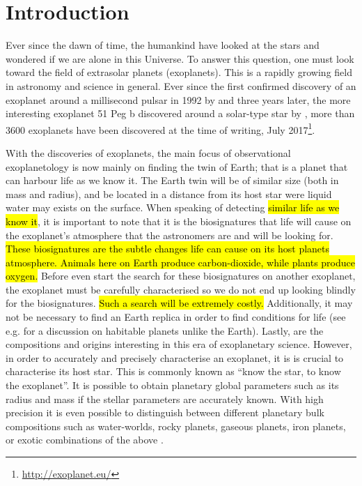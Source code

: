\chapter{Introduction}
\label{cha:introduction}

Ever since the dawn of time, the humankind have looked at the stars and wondered if we are alone in
this Universe. To answer this question, one must look toward the field of extrasolar planets
(exoplanets). This is a rapidly growing field in astronomy and science in general. Ever since the
first confirmed discovery of an exoplanet around a millisecond pulsar in 1992 by
\citet{Wolszczan1992} and three years later, the more interesting exoplanet 51 Peg b discovered
around a solar-type star by \citet{Mayor1995}, more than 3600 exoplanets have been discovered at the
time of writing, July 2017\footnote{\url{http://exoplanet.eu/}}.

With the discoveries of exoplanets, the main focus of observational exoplanetology is now mainly on
finding the twin of Earth; that is a planet that can harbour life as we know it. The Earth twin will
be of similar size (both in mass and radius), and be located in a distance from its host star were
liquid water may exists on the surface. When speaking of detecting \hl{similar life as we know it},
it is important to note that it is the biosignatures that life will cause on the exoplanet's
atmosphere that the astronomers are and will be looking for. \hl{These biosignatures are the subtle
changes life can cause on its host planets atmosphere. Animals here on Earth produce carbon-dioxide,
while plants produce oxygen.} Before even start the search for these biosignatures on another
exoplanet, the exoplanet must be carefully characterised so we do not end up looking blindly for the
biosignatures. \hl{Such a search will be extremely costly.} Additionally, it may not be necessary to
find an Earth replica in order to find conditions for life (see e.g. \citet{Alibert2014} for a
discussion on habitable planets unlike the Earth). Lastly, are the compositions and origins
interesting in this era of exoplanetary science. However, in order to accurately and precisely
characterise an exoplanet, it is is crucial to characterise its host star. This is commonly known as
``know the star, to know the exoplanet''. It is possible to obtain planetary global parameters such
as its radius and mass if the stellar parameters are accurately known. With high precision it is
even possible to distinguish between different planetary bulk compositions such as water-worlds,
rocky planets, gaseous planets, iron planets, or exotic combinations of the above \citep[see
e.g.][]{Dorn2015,Thiabaud2014}.

